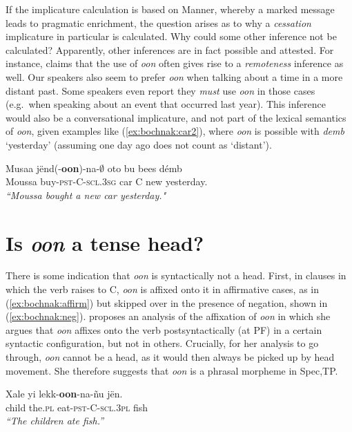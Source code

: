 \documentclass[output=paper,newtxmath,modfonts,nonflat,draftmode]{langsci/langscibook}
\begin{document}
If the implicature calculation is based on Manner, whereby a marked message leads to pragmatic enrichment, the question arises as to why a \textit{cessation} implicature in particular is calculated. Why  could some other inference not be calculated? Apparently, other inferences are in fact possible and attested. For instance, \citet{church81systeme} claims that the use of \textit{oon}
often gives rise to a \textit{remoteness} inference as well. Our speakers also seem to prefer \textit{oon} when talking about a time in a more distant past. Some speakers even report they \textit{must} use \textit{oon} in those cases (e.g.~when speaking about an event that occurred last year). This inference would also be a conversational implicature, and not part of the lexical semantics of \textit{oon}, given examples like (\ref{ex:bochnak:car2}), where \textit{oon} is possible with \textit{demb} `yesterday' (assuming one day ago does not count as `distant').

\ea\label{ex:bochnak:car2}
\gll Musaa j\"end(-\textbf{oon})-na-$\emptyset$ oto bu bees d\'emb \\
Moussa buy\textsc{-pst-C-scl.3sg} car C new yesterday. \\
\glt \textit{``Moussa bought a new car yesterday."} 
\z



\section{Is \textit{oon} a tense head?}

There is some indication that \textit{oon} is syntactically not a
head. First, in clauses in which the verb raises to C, \textit{oon} is
affixed onto it in affirmative cases, as in (\ref{ex:bochnak:affirm}) but skipped over in the presence
of negation, shown in (\ref{ex:bochnak:neg}). \cite{Martinovic2015b, Martinovic2016a} proposes an
analysis of the affixation of \textit{oon} in which she argues that
\textit{oon} affixes onto
the verb postsyntactically (at PF) in a certain syntactic
configuration, but not in others. Crucially, for her analysis to go
through, \textit{oon} cannot be a head, as it would then always be
picked up by head movement. She therefore suggests that \textit{oon}
is a phrasal morpheme in Spec,TP.


  
\ea
\gll Xale yi lekk-\textbf{oon}-na-\~nu j\"en.\\
child the.\textsc{pl} eat-\textsc{pst-C-scl.3pl} fish\\
\glt \textit{``The children ate fish.''}\label{ex:bochnak:affirm}
\z
\end{document}
